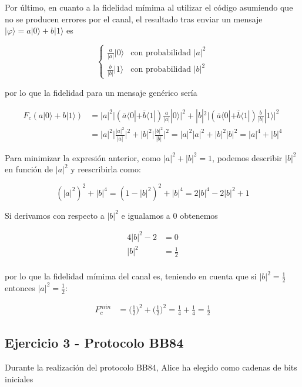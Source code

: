 \documentclass{article}
\begin{document}
Por último, en cuanto a la fidelidad mímima al utilizar el código
asumiendo que no se producen errores por el canal, el resultado tras
enviar un mensaje $|\varphi\rangle = a|0\rangle + b|1\rangle$ es 

$$
\begin{cases}
  \frac{a}{|a|}|0\rangle 
    &\text{con probabilidad } |a|^2 \\
  \frac{b}{|b|}|1\rangle 
    &\text{con probabilidad } |b|^2
\end{cases}
$$

por lo que la fidelidad para un mensaje genérico sería 

\begin{align*}
  F_c(a|0\rangle + b|1\rangle) &= |a|^2\Big|(
    \overline{a}\langle0| + \overline{b}\langle 1| 
  )\frac{a}{|a|}|0\rangle\Big|^2 
  + |b|^2\Big|(
    \overline{a}\langle0| + \overline{b}\langle 1| 
  )\frac{b}{|b|}|1\rangle\Big|^2 \\ 
  &= |a|^2\Big|
    \frac{|a|^2}{|a|} 
  \Big|^2 
  + |b|^2\Big|
    \frac{|b|^2}{|b|}
  \Big|^2
  = |a|^2|a|^2 + |b|^2|b|^2
  = |a|^4 + |b|^4
\end{align*}

Para minimizar la expresión anterior, como $|a|^2 + |b|^2 = 1$,
podemos describir $|b|^2$ en función de $|a|^2$ y reescribirla como:

$$
  (|a|^2)^2 + |b|^4 = (1 - |b|^2)^2 + |b|^4 = 2|b|^4 - 2|b|^2 + 1
$$

Si derivamos con respecto a $|b|^2$ e igualamos a $0$ obtenemos 

\begin{align*}
  4|b|^2 - 2 &= 0 \\ 
  |b|^2 &= \frac{1}{2} \\
\end{align*}

por lo que la fidelidad mímima del canal es, teniendo en cuenta que
si $|b|^2 = \frac{1}{2}$ entonces $|a|^2 = \frac{1}{2}$:

\begin{align*}
  F_c^{min} 
    &= \Big(\frac{1}{2}\Big)^2 + \Big(\frac{1}{2}\Big)^2
    = \frac{1}{4} + \frac{1}{4} 
    = \frac{1}{2} 
\end{align*}

\subsection*{Ejercicio 3 - Protocolo BB84}

Durante la realización del protocolo BB84, Alice ha elegido como
cadenas de bits iniciales 
\end{document}
